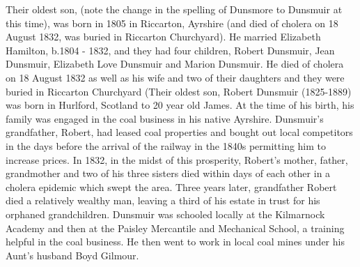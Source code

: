 {{Their oldest son,  (note the change in the spelling of Dunsmore to Dunsmuir at this time), was born in	1805 in Riccarton, Ayrshire (and died of cholera on 18 August 1832, was buried in Riccarton Churchyard). He married Elizabeth Hamilton, b.1804 - 1832, and they had four children, Robert Dunsmuir, Jean Dunsmuir, Elizabeth Love Dunsmuir and Marion Dunsmuir. He died of cholera on 18 August 1832 as well as his wife and two of their daughters and they were buried in Riccarton Churchyard (\endquotation Their oldest son, Robert Dunsmuir (1825-1889) was born in Hurlford, Scotland to 20 year old James. At the time of his birth, his family was engaged in the coal business in his native Ayrshire. Dunsmuir's grandfather, Robert, had leased coal properties and bought out local competitors in the days before the arrival of the railway in the 1840s permitting him to increase prices. In 1832, in the midst of this prosperity, Robert's mother, father, grandmother and two of his three sisters died within days of each other in a cholera epidemic which swept the area. Three years later, grandfather Robert died a relatively wealthy man, leaving a third of his estate in trust for his orphaned grandchildren. Dunsmuir was schooled locally at the Kilmarnock Academy and then at the Paisley Mercantile and Mechanical School, a training helpful in the coal business. He then went to work in local coal mines under his Aunt's husband Boyd Gilmour.
}}
